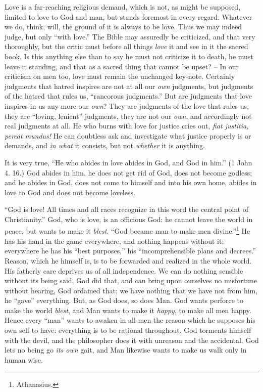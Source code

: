 \documentclass[12pt,a4paper]{book}
\begin{document}
Love is a far-reaching religious demand, which is not, as might be supposed, 
limited to love to God and man, but stands foremost in every regard. Whatever 
we do, think, will, the ground of it is always to be love. Thus we may indeed 
judge, but only ``with love.'' The Bible may assuredly be criticized, and 
that very thoroughly, but the critic must before all things \textit{love} it 
and see in it the sacred book. Is this anything else than to say he must not 
criticize it to death, he must leave it standing, and that as a sacred thing 
that cannot be upset? -- In our criticism on men too, love must remain the 
unchanged key-note. Certainly judgments that hatred inspires are not at all 
our \textit{own} judgments, but judgments of the hatred that rules us, 
``rancorous judgments.'' But are judgments that love inspires in us any more 
our \textit{own}? They are judgments of the love that rules us, they are 
``loving, lenient'' judgments, they are not our \textit{own}, and 
accordingly not real judgments at all. He who burns with love for justice 
cries out, \textit{fiat justitia, pereat mundus!} He can doubtless ask and 
investigate what justice properly is or demands, and \textit{in what} it 
consists, but not \textit{whether} it is anything.

It is very true, ``He who abides in love abides in God, and God in him.'' (1 
John 4. 16.) God abides in him, he does not get rid of God, does not become 
godless; and he abides in God, does not come to himself and into his own home, 
abides in love to God and does not become loveless.

``God is love! All times and all races recognize in this word the central 
point of Christianity.'' God, who is love, is an officious God: he cannot 
leave the world in peace, but wants to make it \textit{blest}. ``God became 
man to make men divine.''\footnote{Athanasius.} He has his hand in the game 
everywhere, and nothing happens without it; everywhere he has his ``best 
purposes,'' his ``incomprehensible plans and decrees.'' Reason, which he 
himself is, is to be forwarded and realized in the whole world. His fatherly 
care deprives us of all independence. We can do nothing sensible without its 
being said, God did that, and can bring upon ourselves no misfortune without 
hearing, God ordained that; we have nothing that we have not from him, he 
``gave'' everything. But, as God does, so does Man. God wants perforce to 
make the world \textit{blest}, and Man wants to make it \textit{happy}, to 
make all men happy. Hence every ``man'' wants to awaken in all men the 
reason which he supposes his own self to have: everything is to be rational 
throughout. God torments himself with the devil, and the philosopher does it 
with unreason and the accidental. God lets no being go \textit{its own} gait, 
and Man likewise wants to make us walk only in human wise.
\end{document}
